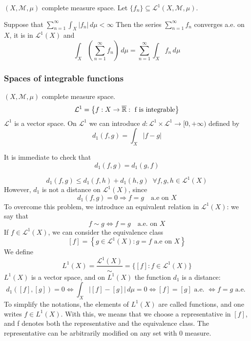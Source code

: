 \begin{proposition}
    \((X, \mathcal{M}, \mu)\) complete measure space. Let \(\{f_n\} \subseteq \mathcal{L}^1(X, \mathcal{M}, \mu)\). 
    
    Suppose that \(\sum_{n=1}^\infty \int_X |f_n| \, d\mu < \infty\)
    Then the series \(\sum_{n=1}^\infty f_n\) converges a.e. on \(X\), it is in \(\mathcal{L}^1(X)\) and 
    \[
        \int_X \left( \sum_{n=1}^\infty f_n  \right) \, d\mu = \sum_{n=1}^\infty \int_X f_n \, d\mu
    \]
\end{proposition}


\subsubsection*{Spaces of integrable functions}
\((X, \mathcal{M}, \mu)\) complete measure space.
\[
    \mathcal{L}^1 = \left\lbrace f: X \to \overline{\mathbb{R}} : \mbox{ f is integrable}\right\rbrace
\]
\(\mathcal{L}^1\) is a vector space. On \(\mathcal{L}^1\) we can introduce \(d : \mathcal{L}^1 \times \mathcal{L}^1 \to [0, +\infty)\) defined by 
\[
    d_1 (f,g) =\int_{X} \vert f-g \vert 
\]

It is immediate to check that 
\[
    d_1 (f, g) = d_1(g, f) \tag*{(symmetry)}
\]  

\[
    d_1(f, g) \leq d_1(f, h) + d_1(h, g) \; \;\forall f, g, h \in \mathcal{L}^1(X) \tag*{(triangular inequality)}
\]  
However, \(d_1\) is not a distance on \(\mathcal{L}^1(X)\), since 
\[
    d_1(f,g) = 0 \Rightarrow f=g \quad \mbox{a.e on }X
\tag*{(pseudo-distance)}\]
To overcome this problem, we introduce an equivalent relation in \(\mathcal{L}^1(X)\): we say that 
\[
    f \sim g \Leftrightarrow f = g \quad \mbox{a.e. on }X
\]
If \(f \in \mathcal{L}^1(X)\), we can consider the equivalence class
\[
    [f] = \left\lbrace g \in \mathcal{L}^1(X) : g = f \mbox{ a.e on }X \right\rbrace
\]
We define
\[
    L^1(X) = \frac{\mathcal{L}^1(X)}{\sim} = \{[f]: f \in \mathcal{L}^1(X)\}
\]
\(L^1(X)\) is a vector space, and on \(L^1(X)\) the function \(d_1\) is a distance: 
\[
    d_1([f], [g]) = 0 \Leftrightarrow \int_X |[f]-[g]|\, d\mu =0 \Leftrightarrow [f]= [g] \text{ a.e. } \Leftrightarrow f=g \text{ a.e. }
\]
To simplify the notations, the elements of \(L^1(X)\) are called functions, and one writes \(f \in L^1(X)\). With this, we means that we choose a representative in \([f]\), and f denotes both the representative and the equivalence class. The representative can be arbitrarily modified on any set with \(0\) measure.

